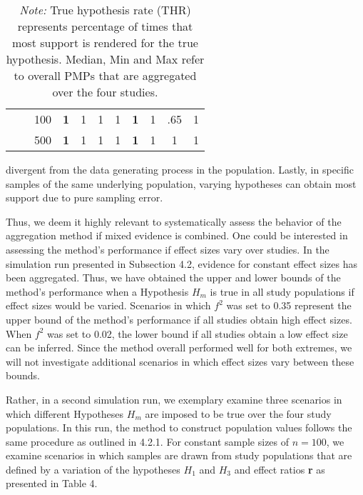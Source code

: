 \documentclass[11pt, a4paper]{article} %
\begin{document}
\begin{table}[H]
\begin{tabular}{lllcccccccc}
		&                           & 100                     & \textbf{1}     & 1     & 1     & 1    & \textbf{1}      & 1      & .65   & 1     \\
		&                           & 500                     & \textbf{1}     & 1     & 1     & 1    & \textbf{1}      & 1      & 1     & 1     \\ \hline
	\end{tabular}
\caption*{\textit{Note:} True hypothesis rate (THR) represents percentage of times that most support is rendered for the true hypothesis. Median, Min and Max refer to overall PMPs that are aggregated over the four studies.}
\end{table}

\noindent divergent from the data generating process in the population. Lastly, in specific samples of the same underlying population, varying hypotheses can obtain most support due to pure sampling error. 

Thus, we deem it highly relevant to systematically assess the behavior of the aggregation method if mixed evidence is combined. One could be interested in assessing the method's performance if effect sizes vary over studies. In the simulation run presented in Subsection 4.2, evidence for constant effect sizes has been aggregated. Thus, we have obtained the upper and lower bounds of the method's performance when a Hypothesis $H_m$ is true in all study populations if effect sizes would be varied. Scenarios in which $f^2$ was set to 0.35 represent the upper bound of the method's performance if all studies obtain high effect sizes. When $f^2$ was set to 0.02, the lower bound if all studies obtain a low effect size can be inferred. Since the method overall performed well for both extremes, we will not investigate additional scenarios in which effect sizes vary between these bounds. 

Rather, in a second simulation run, we exemplary examine three scenarios in which different Hypotheses $H_m$ are imposed to be true over the four study populations. In this run, the method to construct population values follows the same procedure as outlined in 4.2.1. For constant sample sizes of $n=100$, we examine scenarios in which samples are drawn from study populations that are defined by a variation of the hypotheses $H_1$ and $H_3$ and effect ratios \textbf{r} as presented in Table 4.  
\end{document}
